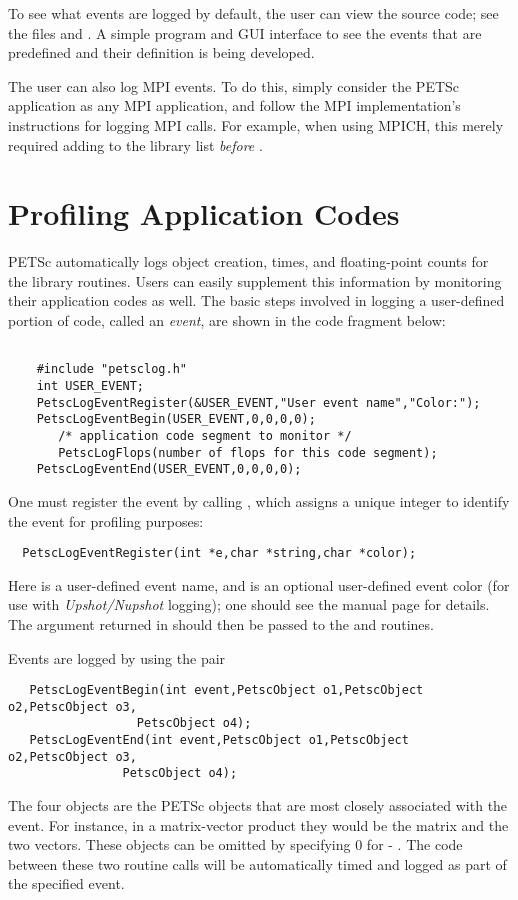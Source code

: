 To see what events are logged by default, the user can view the source code; see
the files  and .  A simple program and
GUI interface to see the events that are predefined and their definition is 
being developed.

The user can also log MPI events.  To do this, simply consider the
PETSc application as any MPI application, and follow the MPI
implementation's instructions for logging MPI calls. For example, when
using MPICH, this merely required adding  to the library
list {\em before} .

\section{Profiling Application Codes}
\label{sec:profileuser}

PETSc automatically logs object creation, times, and floating-point
counts for the library routines. Users can easily supplement
this information by monitoring their application codes as well.  
The basic steps involved in logging a
user-defined portion of code, called an {\em event}, are shown in the 
code fragment below:
\begin{verbatim}

    #include "petsclog.h"
    int USER_EVENT;
    PetscLogEventRegister(&USER_EVENT,"User event name","Color:");
    PetscLogEventBegin(USER_EVENT,0,0,0,0);
       /* application code segment to monitor */
       PetscLogFlops(number of flops for this code segment);
    PetscLogEventEnd(USER_EVENT,0,0,0,0);

\end{verbatim}

One must register the event by calling , which assigns a unique integer to identify the
event for profiling purposes: 
\begin{verbatim}
  PetscLogEventRegister(int *e,char *string,char *color);
\end{verbatim}
Here  is a user-defined event name, and  is an
optional user-defined event color (for use with {\em Upshot/Nupshot} logging);
one should see the manual page for details.  The argument returned in  should then
be passed to the  and 
routines.

Events are logged by using the pair 
\begin{verbatim}
   PetscLogEventBegin(int event,PetscObject o1,PetscObject o2,PetscObject o3,
                  PetscObject o4);
   PetscLogEventEnd(int event,PetscObject o1,PetscObject o2,PetscObject o3,
                PetscObject o4);
\end{verbatim}
The 
four objects are the PETSc objects that are most closely associated 
with the event.  For instance, in a matrix-vector product they 
would be the matrix and the two vectors.  These objects can be omitted
by specifying 0 for  - .  The code between these 
two routine calls will be automatically timed and logged as part of the
specified event.

